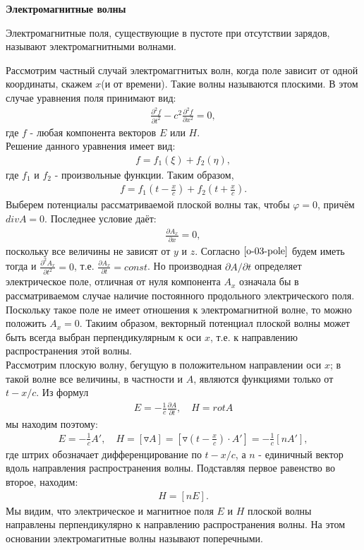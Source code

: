 \textbf{Электромагнитные волны}\\
\begin{definition}
	\label{o-03-def-emw}
	Электромагнитные поля, существующие в пустоте при отсутствии зарядов, называют электромагнитными волнами.
\end{definition}
Рассмотрим частный случай электромаггнитых волн, когда поле зависит от одной координаты, скажем $x$(и от времени). Такие волны называются плоскими. В этом случае уравнения поля принимают вид:
\begin{gather}
\label{o-03-pole}
	\frac{\partial^2f}{\partial t^2} - c^2\frac{\partial^2f}{\partial x^2} = 0,
\end{gather}
где $f$ - любая компонента векторов $E$ или $H$.\\ 
Решение данного уравнения имеет вид:
\begin{gather*}
	f = f_1(\xi) + f_2(\eta),
\end{gather*}
где $f_1$ и $f_2$ - произвольные функции. Таким образом,
\begin{gather}
	\label{o-03-f}
	f = f_1(t - \frac{x}{c}) + f_2(t + \frac{x}{c}).
\end{gather}
Выберем потенциалы рассматриваемой плоской волны так, чтобы $\varphi = 0$, причём  $div A = 0$. Последнее условие даёт:
\begin{gather*}
	\frac{\partial A_x}{\partial x} = 0,
\end{gather*}
поскольку все величины не зависят от $y$ и $z$. Согласно $\ref{o-03-pole}$ будем иметь тогда и $\frac{\partial^2A_x}{\partial t^2} = 0$, т.е. $\frac{\partial A_x}{\partial t} = const$. Но производная $\partial A/\partial t$ определяет электрическое поле, отличная от нуля компонента $A_x$ означала бы в рассматриваемом случае наличие постоянного продольного электрического поля. Поскольку такое поле не имеет отношения к электромагнитной волне, то можно положить $A_x = 0$.
Такиим образом, векторный потенциал плоской волны может быть всегда выбран перпендикулярным к оси $x$, т.е. к направлению распространения этой волны.\\
Рассмотрим плоскую волну, бегущую в положительном направлении оси $x$; в такой волне все величины, в частности и $A$, являются функциями только от $t - x/c$. Из формул
\begin{gather*}
	E = -\frac{1}{c}\frac{\partial A}{\partial t}, \quad H = rot A
\end{gather*}
мы находим поэтому:
\begin{gather*}
	E = -\frac{1}{c}A', \quad H = [\triangledown A] = [\triangledown (t - \frac{x}{c})\cdot A'] = -\frac{1}{c}[nA'],
\end{gather*}
где штрих обозначает дифференцирование по $t - x/c$, а $n$ - единичный вектор вдоль направления распространения волны. Подставляя первое равенство во второе, находим:
\begin{gather}
\label{o-03-H}
	H = [nE].
\end{gather}
Мы видим, что электрическое и магнитное поля $E$ и $H$ плоской волны направлены перпендикулярно к направлению распространения волны. На этом основании электромагитные волны называют поперечными.

